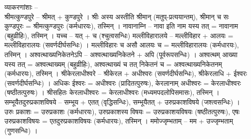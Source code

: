 {व्याकरणांशाः –}\\
श्रीमत्कुण्डपुरे – श्रीमत् + कुण्डपुरे । श्रीः अस्य अस्तीति श्रीमान् (मतुप्-प्रत्ययान्तम्), श्रीमान् च सः कुण्डपुरः = श्रीमत्कुण्डपुरः (कर्मधारयः), तस्मिन् ।
नावानाम्नि – नावा इति नाम यस्य तत् = नावानाम (बहुव्रीहिः), तस्मिन् ।
यच्च – यत् + च (श्चुत्वसन्धिः)
मल्लीविहारालये – मल्लीविहार + आलयः = मल्लीविहारालयः (सवर्णदीर्घसन्धिः) । मल्लीविहारः च असौ आलयः च = मल्लीविहारालयः (कर्मधारयः), तस्मिन् ।
अश्वत्थाख्यनिकेतनेऽपि – अश्वत्थाख्यनिकेतने + अपि (पूर्वरूपसन्धिः) । अश्वत्थम् आख्या यस्य तत् = अश्वत्थाख्यम् (बहुव्रीहिः), अश्वत्थाख्यं च तत् निकेतनं च = अश्वत्थाख्यनिकेतनम् (कर्मधारयः), तस्मिन् ।
श्रीकेरलाधीश्वरे – श्रीकेरल + अधीश्वरः (सवर्णदीर्घसन्धिः), श्रीकेरलाधि + ईश्वरः (सवर्णदीर्घसन्धिः) । अधिकः ईश्वरः = अधीश्वरः (प्रादितत्पुरुषः), केरलानाम् अधीश्वरः = केरलाधीश्वरः (षष्ठीतत्पुरुषः) । श्रीसहितः केरलाधीश्वरः = केरलाधीश्वरः (मध्यमपदलोपिसमासः), तस्मिन् ।
सम्भूयैतदुरुप्रकाशविषये – सम्भूय + एतत् (वृद्धिसन्धिः), सम्भूयैतत् + उरुप्रकाशविषये (जश्त्वसन्धिः) । उरुः प्रकाशः = उरुप्रकाशः (कर्मधारयः), उरुप्रकाशस्य विषयः = उरुप्रकाशयविषयः (षष्ठीतत्पुरुषः), एषः उरुप्रकाशविषयः = एतदुरुप्रकाशविषयः (कर्मधारयः), तस्मिन् ।
ममोज्जृम्भताम् – मम + उज्जृम्भताम् (गुणसन्धिः) ।
